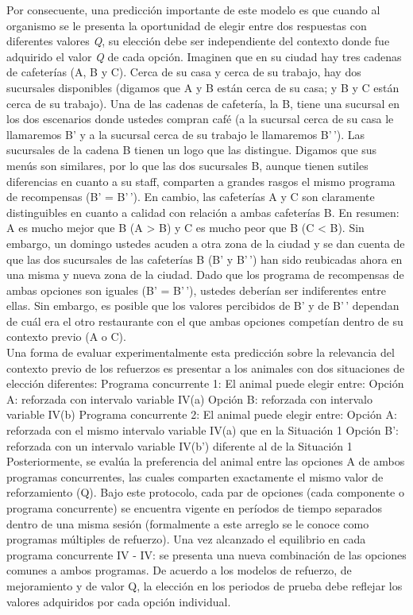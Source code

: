 \documentclass[
  a4paper,
  DIV=11,
  numbers=noendperiod]{scrreprt}
\begin{document}
Por consecuente, una predicción importante de este modelo es que cuando
al organismo se le presenta la oportunidad de elegir entre dos
respuestas con diferentes valores \emph{Q}, su elección debe ser
independiente del contexto donde fue adquirido el valor \emph{Q} de cada
opción. Imaginen que en su ciudad hay tres cadenas de cafeterías (A, B y
C). Cerca de su casa y cerca de su trabajo, hay dos sucursales
disponibles (digamos que A y B están cerca de su casa; y B y C están
cerca de su trabajo). Una de las cadenas de cafetería, la B, tiene una
sucursal en los dos escenarios donde ustedes compran café (a la sucursal
cerca de su casa le llamaremos B' y a la sucursal cerca de su trabajo le
llamaremos B'\,'). Las sucursales de la cadena B tienen un logo que las
distingue. Digamos que sus menús son similares, por lo que las dos
sucursales B, aunque tienen sutiles diferencias en cuanto a su staff,
comparten a grandes rasgos el mismo programa de recompensas (B' =
B'\,'). En cambio, las cafeterías A y C son claramente distinguibles en
cuanto a calidad con relación a ambas cafeterías B. En resumen: A es
mucho mejor que B (A \textgreater{} B) y C es mucho peor que B (C
\textless{} B). Sin embargo, un domingo ustedes acuden a otra zona de la
ciudad y se dan cuenta de que las dos sucursales de las cafeterías B (B'
y B'\,') han sido reubicadas ahora en una misma y nueva zona de la
ciudad. Dado que los programa de recompensas de ambas opciones son
iguales (B' = B'\,'), ustedes deberían ser indiferentes entre ellas. Sin
embargo, es posible que los valores percibidos de B' y de B'\,' dependan
de cuál era el otro restaurante con el que ambas opciones competían
dentro de su contexto previo (A o C).\\
Una forma de evaluar experimentalmente esta predicción sobre la
relevancia del contexto previo de los refuerzos es presentar a los
animales con dos situaciones de elección diferentes: Programa
concurrente 1: El animal puede elegir entre: Opción A: reforzada con
intervalo variable IV(a) Opción B: reforzada con intervalo variable
IV(b) Programa concurrente 2: El animal puede elegir entre: Opción A:
reforzada con el mismo intervalo variable IV(a) que en la Situación 1
Opción B': reforzada con un intervalo variable IV(b') diferente al de la
Situación 1 Posteriormente, se evalúa la preferencia del animal entre
las opciones A de ambos programas concurrentes, las cuales comparten
exactamente el mismo valor de reforzamiento (Q). Bajo este protocolo,
cada par de opciones (cada componente o programa concurrente) se
encuentra vigente en períodos de tiempo separados dentro de una misma
sesión (formalmente a este arreglo se le conoce como programas múltiples
de refuerzo). Una vez alcanzado el equilibrio en cada programa
concurrente IV - IV: se presenta una nueva combinación de las opciones
comunes a ambos programas. De acuerdo a los modelos de refuerzo, de
mejoramiento y de valor Q, la elección en los periodos de prueba debe
reflejar los valores adquiridos por cada opción individual.
\end{document}
